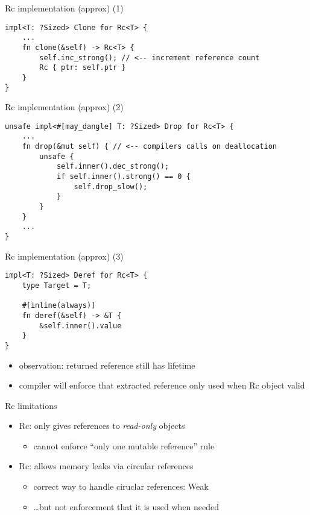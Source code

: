 \begin{frame}[fragile,label=rcImplA]{Rc implementation (approx) (1)}
\begin{verbatim}
impl<T: ?Sized> Clone for Rc<T> {
    ... 
    fn clone(&self) -> Rc<T> {
        self.inc_strong(); // <-- increment reference count
        Rc { ptr: self.ptr }
    }
}
\end{verbatim}
\end{frame}

\begin{frame}[fragile,label=rcImplB]{Rc implementation (approx) (2)}
\begin{verbatim}
unsafe impl<#[may_dangle] T: ?Sized> Drop for Rc<T> {
    ...
    fn drop(&mut self) { // <-- compilers calls on deallocation
        unsafe {
            self.inner().dec_strong();
            if self.inner().strong() == 0 {
                self.drop_slow();
            }
        }
    }
    ...
}
\end{verbatim}
\end{frame}

\begin{frame}[fragile,label=rcImplC]{Rc implementation (approx) (3)}
\begin{verbatim}
impl<T: ?Sized> Deref for Rc<T> {
    type Target = T;

    #[inline(always)]
    fn deref(&self) -> &T {
        &self.inner().value
    }
}
\end{verbatim}
\begin{itemize}
\item observation: returned reference still has lifetime
\item compiler will enforce that extracted reference only used when Rc object valid
\end{itemize}
\end{frame}


\begin{frame}{Rc limitations}
    \begin{itemize}
    \item Rc: only gives references to \textit{read-only} objects
        \begin{itemize}
        \item cannot enforce ``only one mutable reference'' rule
        \end{itemize}
    \item Rc: allows memory leaks via circular references
        \begin{itemize}
        \item correct way to handle ciruclar references: Weak
        \item \ldots but not enforcement that it is used when needed
        \end{itemize}
    \end{itemize}
\end{frame}

